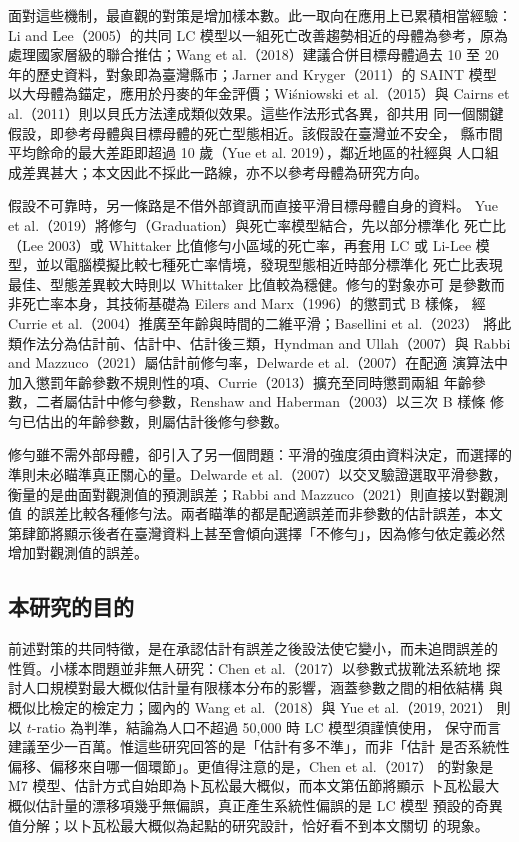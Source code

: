 \documentclass[UTF8, fontset=macnew, a4paper, 12pt]{ctexart}
\begin{document}
面對這些機制，最直觀的對策是增加樣本數。此一取向在應用上已累積相當經驗：
Li and Lee（2005）的共同 LC 模型以一組死亡改善趨勢相近的母體為參考，原為
處理國家層級的聯合推估；Wang et al.（2018）建議合併目標母體過去 10 至
20 年的歷史資料，對象即為臺灣縣市；Jarner and Kryger（2011）的 SAINT 模型
以大母體為錨定，應用於丹麥的年金評價；Wiśniowski et al.（2015）與
Cairns et al.（2011）則以貝氏方法達成類似效果。這些作法形式各異，卻共用
同一個關鍵假設，即參考母體與目標母體的死亡型態相近。該假設在臺灣並不安全，
縣市間平均餘命的最大差距即超過 10 歲（Yue et al. 2019），鄰近地區的社經與
人口組成差異甚大；本文因此不採此一路線，亦不以參考母體為研究方向。

假設不可靠時，另一條路是不借外部資訊而直接平滑目標母體自身的資料。
Yue et al.（2019）將修勻（Graduation）與死亡率模型結合，先以部分標準化
死亡比（Lee 2003）或 Whittaker 比值修勻小區域的死亡率，再套用 LC 或
Li-Lee 模型，並以電腦模擬比較七種死亡率情境，發現型態相近時部分標準化
死亡比表現最佳、型態差異較大時則以 Whittaker 比值較為穩健。修勻的對象亦可
是參數而非死亡率本身，其技術基礎為 Eilers and Marx（1996）的懲罰式 B 樣條，
經 Currie et al.（2004）推廣至年齡與時間的二維平滑；Basellini et al.（2023）
將此類作法分為估計前、估計中、估計後三類，Hyndman and Ullah（2007）與
Rabbi and Mazzuco（2021）屬估計前修勻率，Delwarde et al.（2007）在配適
演算法中加入懲罰年齡參數不規則性的項、Currie（2013）擴充至同時懲罰兩組
年齡參數，二者屬估計中修勻參數，Renshaw and Haberman（2003）以三次 B 樣條
修勻已估出的年齡參數，則屬估計後修勻參數。

修勻雖不需外部母體，卻引入了另一個問題：平滑的強度須由資料決定，而選擇的
準則未必瞄準真正關心的量。Delwarde et al.（2007）以交叉驗證選取平滑參數，
衡量的是曲面對觀測值的預測誤差；Rabbi and Mazzuco（2021）則直接以對觀測值
的誤差比較各種修勻法。兩者瞄準的都是配適誤差而非參數的估計誤差，本文
第肆節將顯示後者在臺灣資料上甚至會傾向選擇「不修勻」，因為修勻依定義必然
增加對觀測值的誤差。

\subsection{本研究的目的}\label{sec:goal}

前述對策的共同特徵，是在承認估計有誤差之後設法使它變小，而未追問誤差的
性質。小樣本問題並非無人研究：Chen et al.（2017）以參數式拔靴法系統地
探討人口規模對最大概似估計量有限樣本分布的影響，涵蓋參數之間的相依結構
與概似比檢定的檢定力；國內的 Wang et al.（2018）與 Yue et al.（2019, 2021）
則以 $t$-ratio 為判準，結論為人口不超過 50{,}000 時 LC 模型須謹慎使用，
保守而言建議至少一百萬。惟這些研究回答的是「估計有多不準」，而非「估計
是否系統性偏移、偏移來自哪一個環節」。更值得注意的是，Chen et al.（2017）
的對象是 M7 模型、估計方式自始即為卜瓦松最大概似，而本文第伍節將顯示
卜瓦松最大概似估計量的漂移項幾乎無偏誤，真正產生系統性偏誤的是 LC 模型
預設的奇異值分解；以卜瓦松最大概似為起點的研究設計，恰好看不到本文關切
的現象。
\end{document}
